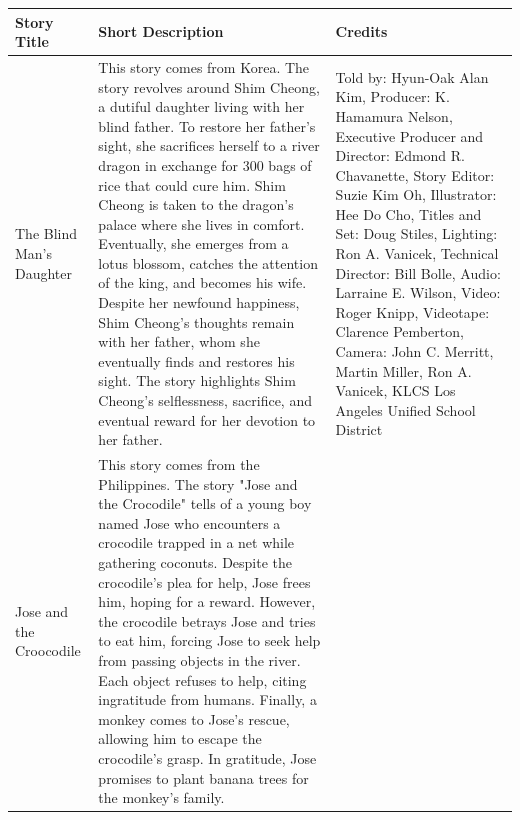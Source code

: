 \begin{table}[h]
    \centering
    \begin{small}

        \begin{tabular}{|p{1.5cm}|p{8.5cm}|p{7cm}|}
            \hline
            \textbf{Story Title} & \textbf{Short Description} & \textbf{Credits} \\
            \hline
            The Blind Man's Daughter
                                 &
            This story comes from Korea. The story revolves around Shim Cheong, a dutiful daughter living with her blind father.
            To restore her father's sight, she sacrifices herself to a river dragon in exchange for 300 bags of rice that could cure him.
            Shim Cheong is taken to the dragon's palace where she lives in comfort.
            Eventually, she emerges from a lotus blossom, catches the attention of the king, and becomes his wife.
            Despite her newfound happiness, Shim Cheong's thoughts remain with her father, whom she eventually finds and restores his sight.
            The story highlights Shim Cheong's selflessness, sacrifice, and eventual reward for her devotion to her father.
                                 &
            Told by: Hyun-Oak Alan Kim,
            Producer: K. Hamamura Nelson,
            Executive Producer and Director: Edmond R. Chavanette,
            Story Editor: Suzie Kim Oh,
            Illustrator: Hee Do Cho,
            Titles and Set: Doug Stiles,
            Lighting: Ron A. Vanicek,
            Technical Director: Bill Bolle,
            Audio: Larraine E. Wilson,
            Video: Roger Knipp,
            Videotape: Clarence Pemberton,
            Camera: John C. Merritt, Martin Miller, Ron A. Vanicek,
            KLCS Los Angeles Unified School District
            \\
            \hline
            Jose and the Croocodile
                                 &
            This story comes from the Philippines. The story "Jose and the Crocodile" tells of a young boy named Jose who encounters a crocodile trapped in a net while gathering coconuts.
            Despite the crocodile's plea for help, Jose frees him, hoping for a reward.
            However, the crocodile betrays Jose and tries to eat him, forcing Jose to seek help from passing objects in the river.
            Each object refuses to help, citing ingratitude from humans. Finally, a monkey comes to Jose's rescue, allowing him to escape the crocodile's grasp.
            In gratitude, Jose promises to plant banana trees for the monkey's family.

\end{tabular}
\end{small}
\end{table}
